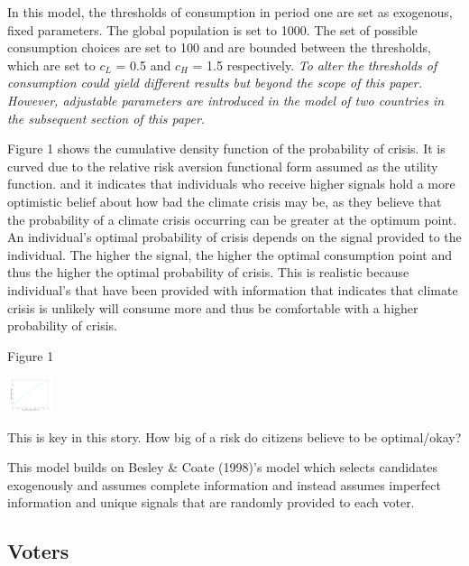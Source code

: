 \documentclass[11pt,preprint, authoryear]{elsarticle}
\let\origfigure\figure
\let\endorigfigure\endfigure
\renewenvironment{figure}[1][2] {
    \expandafter\origfigure\expandafter[H]
} {
    \endorigfigure
}
\numberwithin{equation}{section}
\numberwithin{figure}{section}
\numberwithin{table}{section}
\begin{document}
In this model, the thresholds of consumption in period one are set as
exogenous, fixed parameters. The global population is set to 1000. The
set of possible consumption choices are set to 100 and are bounded
between the thresholds, which are set to \(c_L\) = 0.5 and \(c_H\) = 1.5
respectively. \emph{To alter the thresholds of consumption could yield
different results but beyond the scope of this paper. However,
adjustable parameters are introduced in the model of two countries in
the subsequent section of this paper}.

Figure 1 shows the cumulative density function of the probability of
crisis. It is curved due to the relative risk aversion functional form
assumed as the utility function. and it indicates that individuals who
receive higher signals hold a more optimistic belief about how bad the
climate crisis may be, as they believe that the probability of a climate
crisis occurring can be greater at the optimum point. An individual's
optimal probability of crisis depends on the signal provided to the
individual. The higher the signal, the higher the optimal consumption
point and thus the higher the optimal probability of crisis. This is
realistic because individual's that have been provided with information
that indicates that climate crisis is unlikely will consume more and
thus be comfortable with a higher probability of crisis.

\begin{center}
Figure 1
\end{center}

\begin{figure}
\centering
\includegraphics[width=0.1\textwidth,height=\textheight]{images/Figure1base.jpg}
\caption{Figure1}
\end{figure}

This is key in this story. How big of a risk do citizens believe to be
optimal/okay?

This model builds on Besley \& Coate (1998)'s model which selects
candidates exogenously and assumes complete information and instead
assumes imperfect information and unique signals that are randomly
provided to each voter.

\hypertarget{voters}{%
\subsection*{Voters}\label{voters}}
\end{document}
